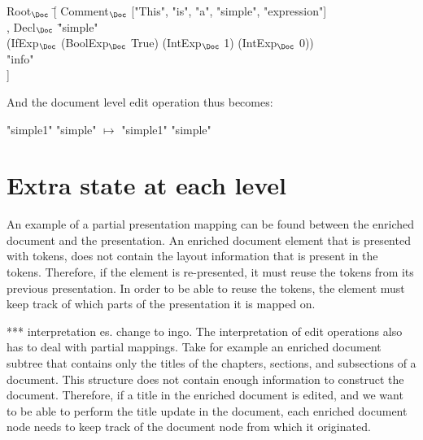\small \ttfamily
\begin{tabbing}
Root$_{\Doc}$ \= [ Comment$_{\Doc}$ ["This", "is", "a", "simple", "expression"] \\
       \> , Decl$_{\Doc}$ \= "simple" \\
       \>                        \>(IfExp$_{\Doc}$ (BoolExp$_{\Doc}$ True) (IntExp$_{\Doc}$ 1) (IntExp$_{\Doc}$ 0))\\
       \>                       \> "info"\\
       \> ] 
\end{tabbing}
\rmfamily \normalsize

And the document level edit operation thus becomes:

\small \ttfamily
\begin{tabbing}
 \ttfamily "simple1"  \ttfamily  "simple" $\mapsto$  \ttfamily  "simple1"  \ttfamily  "simple"
\end{tabbing}
\rmfamily \normalsize






%																
%																
%																
\bc
\section{Extra state at each level} \label{sect:archExtraState}




An example of a partial presentation mapping can be found between the enriched document and the presentation. An enriched document element that is presented with tokens, does not contain the layout information that is present in the tokens. Therefore, if the element is re-presented, it must reuse the tokens from its previous presentation. In order to be able to reuse the tokens, the element must keep track of which parts of the presentation it is mapped on.

*** interpretation es. change to ingo.
The interpretation of edit operations also has to deal with partial mappings. Take for example an enriched document subtree that contains only the titles of the chapters, sections, and subsections of a document. This structure does not contain enough information to construct the document. Therefore, if a title in the enriched document is edited, and we want to be able to perform the title update in the document, each enriched document node needs to keep track of the document node from which it originated.

